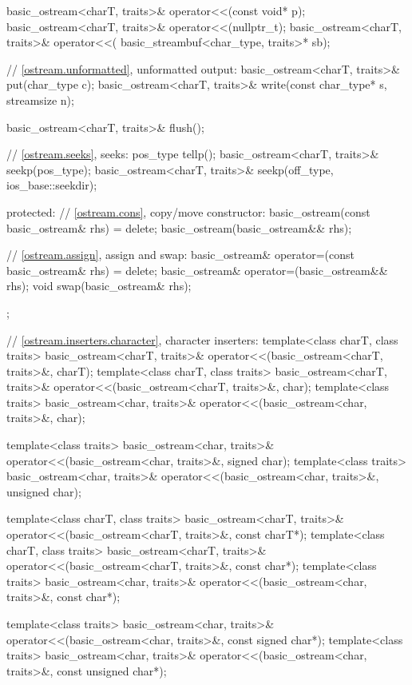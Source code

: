 \begin{codeblock}
{{    basic_ostream<charT, traits>& operator<<(const void* p);
    basic_ostream<charT, traits>& operator<<(nullptr_t);
    basic_ostream<charT, traits>& operator<<(
      basic_streambuf<char_type, traits>* sb);

    // \ref{ostream.unformatted}, unformatted output:
    basic_ostream<charT, traits>& put(char_type c);
    basic_ostream<charT, traits>& write(const char_type* s, streamsize n);

    basic_ostream<charT, traits>& flush();

    // \ref{ostream.seeks}, seeks:
    pos_type tellp();
    basic_ostream<charT, traits>& seekp(pos_type);
    basic_ostream<charT, traits>& seekp(off_type, ios_base::seekdir);

  protected:
    // \ref{ostream.cons}, copy/move constructor:
    basic_ostream(const basic_ostream& rhs) = delete;
    basic_ostream(basic_ostream&& rhs);

    // \ref{ostream.assign}, assign and swap:
    basic_ostream& operator=(const basic_ostream& rhs) = delete;
    basic_ostream& operator=(basic_ostream&& rhs);
    void swap(basic_ostream& rhs);
  };

  // \ref{ostream.inserters.character}, character inserters:
  template<class charT, class traits>
    basic_ostream<charT, traits>& operator<<(basic_ostream<charT, traits>&,
                                             charT);
  template<class charT, class traits>
    basic_ostream<charT, traits>& operator<<(basic_ostream<charT, traits>&,
                                             char);
  template<class traits>
    basic_ostream<char, traits>& operator<<(basic_ostream<char, traits>&,
                                            char);

  template<class traits>
    basic_ostream<char, traits>& operator<<(basic_ostream<char, traits>&,
                                            signed char);
  template<class traits>
    basic_ostream<char, traits>& operator<<(basic_ostream<char, traits>&,
                                            unsigned char);

  template<class charT, class traits>
    basic_ostream<charT, traits>& operator<<(basic_ostream<charT, traits>&,
                                             const charT*);
  template<class charT, class traits>
    basic_ostream<charT, traits>& operator<<(basic_ostream<charT, traits>&,
                                             const char*);
  template<class traits>
    basic_ostream<char, traits>& operator<<(basic_ostream<char, traits>&,
                                            const char*);

  template<class traits>
    basic_ostream<char, traits>& operator<<(basic_ostream<char, traits>&,
                                            const signed char*);
  template<class traits>
    basic_ostream<char, traits>& operator<<(basic_ostream<char, traits>&,
                                            const unsigned char*);
}
\end{codeblock}

